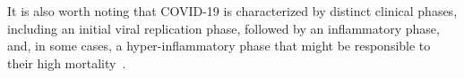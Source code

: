 



It is also worth noting that COVID-19 is characterized by distinct clinical phases, including an initial viral replication phase, followed by an inflammatory phase, and, in some cases, a hyper-inflammatory phase  that might be responsible to their high mortality~\cite{mehta2020covid}.


